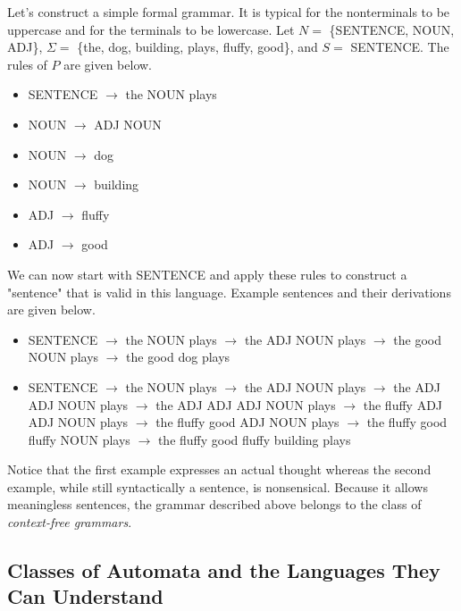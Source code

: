 \begin{tcolorbox}[breakable, enhanced, colback=textbook-blue, sharp corners]
	Let's construct a simple formal grammar. It is typical for the nonterminals to be uppercase and for the terminals to be lowercase. Let $N=$ \{SENTENCE, NOUN, ADJ\}, $\Sigma=$ \{the, dog, building, plays, fluffy, good\}, and $S=$ SENTENCE. The rules of $P$ are given below.
	
	\begin{itemize}
		\item SENTENCE $\rightarrow$ the NOUN plays
		\item NOUN $\rightarrow$ ADJ NOUN
		\item NOUN $\rightarrow$ dog
		\item NOUN $\rightarrow$ building
		\item ADJ $\rightarrow$ fluffy
		\item ADJ $\rightarrow$ good
	\end{itemize}
	
	We can now start with SENTENCE and apply these rules to construct a "sentence" that is valid in this language. Example sentences and their derivations are given below.
	
	\begin{itemize}
		\item SENTENCE $\rightarrow$ the NOUN plays $\rightarrow$ the ADJ NOUN plays $\rightarrow$ the good NOUN plays $\rightarrow$ the good dog plays
		\item SENTENCE $\rightarrow$ the NOUN plays $\rightarrow$ the ADJ NOUN plays $\rightarrow$ the ADJ ADJ NOUN plays $\rightarrow$ the ADJ ADJ ADJ NOUN plays $\rightarrow$ the fluffy ADJ ADJ NOUN plays $\rightarrow$ the fluffy good ADJ NOUN plays $\rightarrow$ the fluffy good fluffy NOUN plays $\rightarrow$ the fluffy good fluffy building plays
	\end{itemize}
	
	Notice that the first example expresses an actual thought whereas the second example, while still syntactically a sentence, is nonsensical. Because it allows meaningless sentences, the grammar described above belongs to the class of \textit{context-free grammars}.
	
	\vspace{3mm}
\end{tcolorbox}
\vspace{2\baselineskip}


\subsection{Classes of Automata and the Languages They Can Understand}

